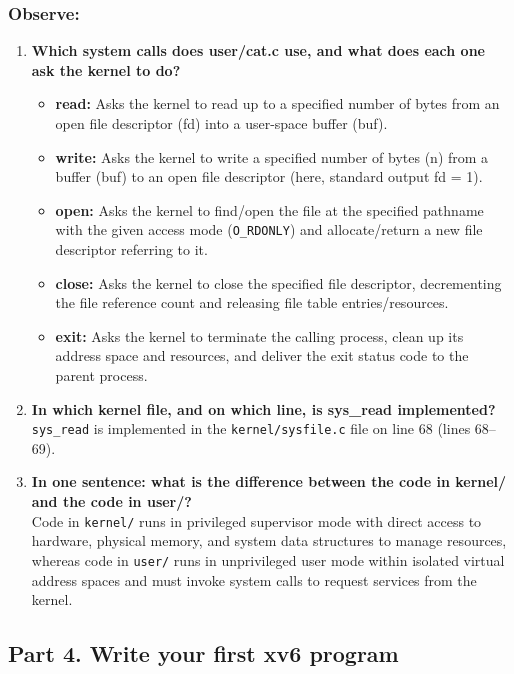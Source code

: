 \documentclass{labreport}
\begin{document}
\subsubsection*{Observe:}
\begin{enumerate}[leftmargin=*]
    \item \textbf{Which system calls does user/cat.c use, and what does each one ask the kernel to do?}
    \begin{itemize}[noitemsep, topsep=2pt]
        \item \textbf{read:} Asks the kernel to read up to a specified number of bytes from an open file descriptor (fd) into a user-space buffer (buf).
        \item \textbf{write:} Asks the kernel to write a specified number of bytes (n) from a buffer (buf) to an open file descriptor (here, standard output fd = 1).
        \item \textbf{open:} Asks the kernel to find/open the file at the specified pathname with the given access mode (\texttt{O\_RDONLY}) and allocate/return a new file descriptor referring to it.
        \item \textbf{close:} Asks the kernel to close the specified file descriptor, decrementing the file reference count and releasing file table entries/resources.
        \item \textbf{exit:} Asks the kernel to terminate the calling process, clean up its address space and resources, and deliver the exit status code to the parent process.
    \end{itemize}

    \item \textbf{In which kernel file, and on which line, is sys\_read implemented?}\\[0.2em]
    \texttt{sys\_read} is implemented in the \texttt{kernel/sysfile.c} file on line 68 (lines 68--69).

    \item \textbf{In one sentence: what is the difference between the code in kernel/ and the code in user/?}\\[0.2em]
    Code in \texttt{kernel/} runs in privileged supervisor mode with direct access to hardware, physical memory, and system data structures to manage resources, whereas code in \texttt{user/} runs in unprivileged user mode within isolated virtual address spaces and must invoke system calls to request services from the kernel.
\end{enumerate}

\subsection{Part 4. Write your first xv6 program}
\end{document}
